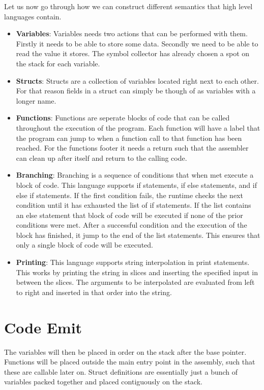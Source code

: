 Let us now go through how we can construct different semantics that high level languages contain. 

\begin{itemize}
    \item \textbf{Variables}: Variables needs two actions that can be performed with them. Firstly it needs to be able to store some data. Secondly we need to be able to read the value it stores. The symbol collector has already chosen a spot on the stack for each variable. 
    \item \textbf{Structs}: Structs are a collection of variables located right next to each other. For that reason fields in a struct can simply be though of as variables with a longer name.
    \item \textbf{Functions}: Functions are seperate blocks of code that can be called throughout the execution of the program. Each function will have a label that the program can jump to when a function call to that function has been reached. For the functions footer it needs a return such that the assembler can clean up after itself and return to the calling code.
    \item \textbf{Branching}: Branching is a sequence of conditions that when met execute a block of code. This language supports if statements, if else statements, and if else if statements. If the first condition fails, the runtime checks the next condition until it has exhausted the list of if statements. If the list contains an else statement that block of code will be executed if none of the prior conditions were met. After a successful condition and the execution of the block has finished, it jump to the end of the list statements. This ensures that only a single block of code will be executed.
    \item \textbf{Printing}: This language supports string interpolation in print statements. This works by printing the string in slices and inserting the specified input in between the slices. The arguments to be interpolated are evaluated from left to right and inserted in that order into the string.
\end{itemize}

\section{Code Emit}

The variables will then be placed in order on the stack after the base pointer. Functions will be placed outside the main entry point in the assembly, such that these are callable later on. Struct definitions are essentially just a bunch of variables packed together and placed contiguously on the stack. 